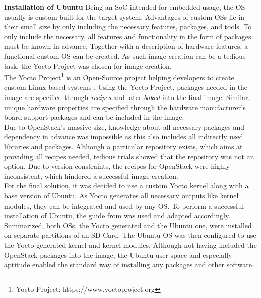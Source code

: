              \noindent \textbf{Installation of Ubuntu}
            Being an \ac{SoC} intended for embedded usage, the \ac{OS} usually is custom-built for the target system.
            Advantages of custom \acp{OS} lie in their small size by only including the necessary features, packages, and tools.
            To only include the necessary, all features and functionality in the form of packages must be known in advance.
            Together with a description of hardware features, a functional custom \ac{OS} can be created.
            As such image creation can be a tedious task, the Yocto Project was chosen for image creation.\\
            The Yocto Project\footnote{Yocto Project: https://www.yoctoproject.org} is an Open-Source project helping developers to create custom Linux-based systems \cite{Yocto2021}.
            Using the Yocto Project, packages needed in the image are specified through \textsl{recipes} and later \textsl{baked} into the final image.
            Similar, unique hardware properties are specified through the hardware manufacturer's board support packages and can be included in the image.\\
            Due to OpenStack's massive size, knowledge about all necessary packages and dependency in advance was impossible as this also includes all indirectly used libraries and packages.
            Although a particular repository exists, which aims at providing all recipes needed, tedious trials showed that the repository was not an option.
            Due to version constraints, the recipes for OpenStack were highly inconsistent, which hindered a successful image creation.\\
            For the final solution, it was decided to use a custom Yocto kernel along with a base version of Ubuntu.
            As Yocto generates all necessary outputs like kernel modules, they can be integrated and used by any \ac{OS}.
            To perform a successful installation of Ubuntu, the guide from \cite{Tnx942412020} was used and adapted accordingly.
            Summarized, both \acp{OS}, the Yocto generated and the Ubuntu one, were installed on separate partitions of an SD-Card.
            The Ubuntu OS was then configured to use the Yocto generated kernel and kernel modules.
            Although not having included the OpenStack packages into the image, the Ubuntu user space and especially aptitude enabled the standard way of installing any packages and other software.
            
